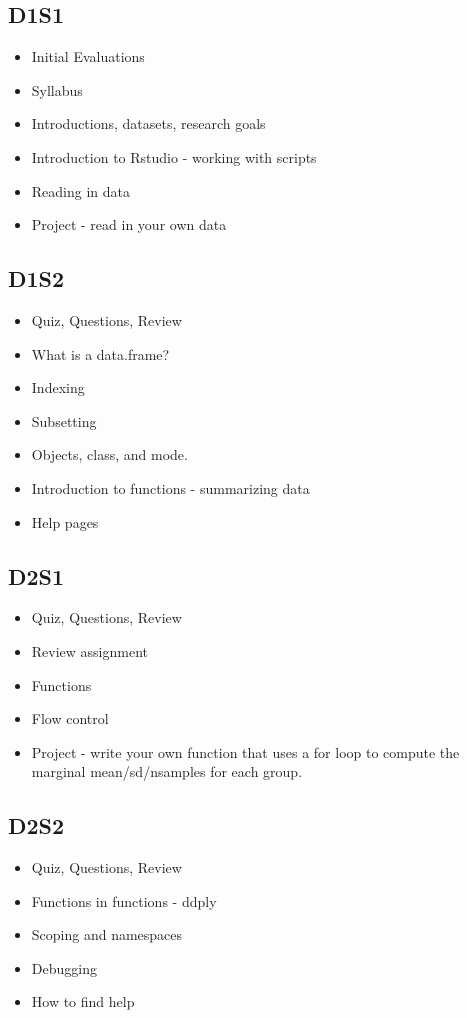 \documentclass[english, letterpaper, 12pt]{article}
\begin{document}
\subsection*{D1S1}
\begin{itemize}
    \item  Initial Evaluations
    \item  Syllabus
    \item  Introductions, datasets, research goals
    \item  Introduction to Rstudio - working with scripts
    \item  Reading in data
    \item  Project - read in your own data
\end{itemize}
\subsection*{D1S2}
\begin{itemize}
    \item  Quiz, Questions, Review
    \item  What is a data.frame?
    \item  Indexing
    \item  Subsetting
    \item  Objects, class, and mode.
    \item  Introduction to functions - summarizing data
    \item  Help pages
\end{itemize}

\subsection*{D2S1}
\begin{itemize}
    \item Quiz, Questions, Review
    \item Review assignment
    \item Functions
    \item Flow control
    \item Project - write your own function that uses a for loop to compute the
marginal mean/sd/nsamples for each group.
\end{itemize}
\subsection*{D2S2}
\begin{itemize}
    \item Quiz, Questions, Review
    \item Functions in functions - ddply
    \item Scoping and namespaces
    \item Debugging
    \item How to find help
\end{itemize}
\end{document}
